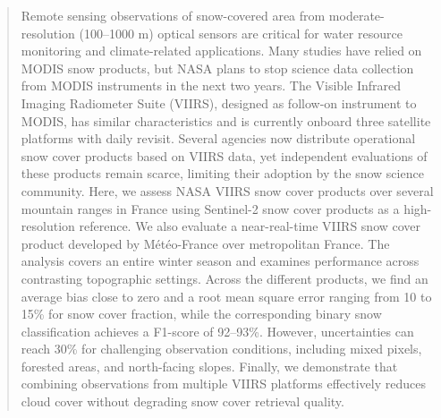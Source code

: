\documentclass[tc, manuscript]{copernicus}
\providecommand{\DIFaddtex}[1]{{\protect\color{blue}\uwave{#1}}} %
\providecommand{\DIFaddbegin}{} %
\providecommand{\DIFaddend}{} %
\providecommand{\DIFadd}[1]{\texorpdfstring{\DIFaddtex{#1}}{#1}} %
\begin{document}
\begin{abstract}
\DIFaddbegin \DIFadd{CIAO }\DIFaddend Remote sensing observations of snow-covered area from moderate-resolution (100–1000 m) optical sensors are critical for water resource monitoring and climate-related applications. Many studies have relied on MODIS snow products, but NASA plans to stop science data collection from MODIS instruments in the next two years. The Visible Infrared Imaging Radiometer Suite (VIIRS), designed as follow-on instrument to MODIS, has similar characteristics and is currently onboard three satellite platforms with daily revisit. Several agencies now distribute operational snow cover products based on VIIRS data, yet independent evaluations of these products remain scarce, limiting their adoption by the snow science community. Here, we assess NASA VIIRS snow cover products over several mountain ranges in France using Sentinel-2 snow cover products as a high-resolution reference. We also evaluate a near-real-time VIIRS snow cover product developed by Météo-France over metropolitan France. The analysis covers an entire winter season and examines performance across contrasting topographic settings. Across the different products, we find an average bias close to zero and a root mean square error ranging from 10 to 15\% for snow cover fraction, while the corresponding binary snow classification achieves a F1-score of 92–93\%. However, uncertainties can reach 30\% for challenging observation conditions, including mixed pixels, forested areas, and north-facing slopes. Finally, we demonstrate that combining observations from multiple VIIRS platforms effectively reduces cloud cover without degrading snow cover retrieval quality.



\end{abstract}




\introduction  %
\end{document}
